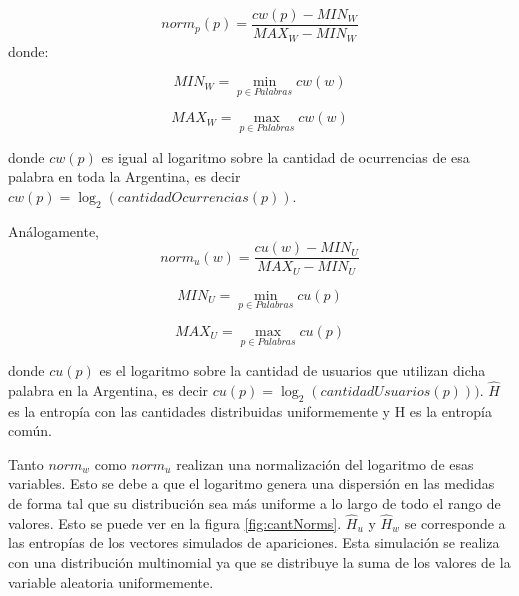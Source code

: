 \begin{equation}
norm_{p}(p) = \frac{cw(p)- MIN_W }{MAX_W - MIN_W}
\label{eq:norm1}
\end{equation}
donde:
\noindent\begin{minipage}{.5\linewidth}
\begin{equation}
  MIN_W = \min\limits_{p \in Palabras} cw(w)
\end{equation}
\end{minipage}%
\begin{minipage}{.5\linewidth}
\begin{equation}
  MAX_W = \max\limits_{p \in Palabras} cw(w)
\end{equation}
\end{minipage}
donde $cw(p)$ es igual al logaritmo sobre la cantidad de ocurrencias de esa palabra en toda la Argentina, es decir $cw(p) = \log_2(cantidadOcurrencias(p))$.

Análogamente,
\begin{equation}
norm_{u}(w) = \frac{cu(w)- MIN_U }{MAX_U - MIN_U}
\label{eq:norm2}
\end{equation}
\noindent\begin{minipage}{.5\linewidth}
\begin{equation}
  MIN_U = \min\limits_{p \in Palabras} cu(p)
\end{equation}
\end{minipage}%
\begin{minipage}{.5\linewidth}
\begin{equation}
  MAX_U = \max\limits_{p \in Palabras} cu(p)
\end{equation}
\end{minipage}
donde $cu(p)$ es el logaritmo sobre  la cantidad de usuarios que utilizan dicha palabra en la Argentina, es decir $cu(p)= \log_2(cantidadUsuarios(p)))$.
$\widehat{H}$ es la entropía con las cantidades distribuidas uniformemente y H es la entropía común.

Tanto $norm_{w}$ como $norm_{u}$ realizan una normalización del logaritmo de esas variables. Esto se debe a que el logaritmo genera una dispersión en las medidas de forma tal que su distribución sea más uniforme a lo largo de todo el rango de valores. Esto se puede ver en la figura \ref{fig:cantNorms}.
$\widehat{H}_{u}$ y $\widehat{H}_{w}$ se corresponde a las entropías de los vectores simulados de apariciones.
Esta simulación se realiza con una distribución multinomial ya que se distribuye la suma de los valores de la variable aleatoria uniformemente. 

